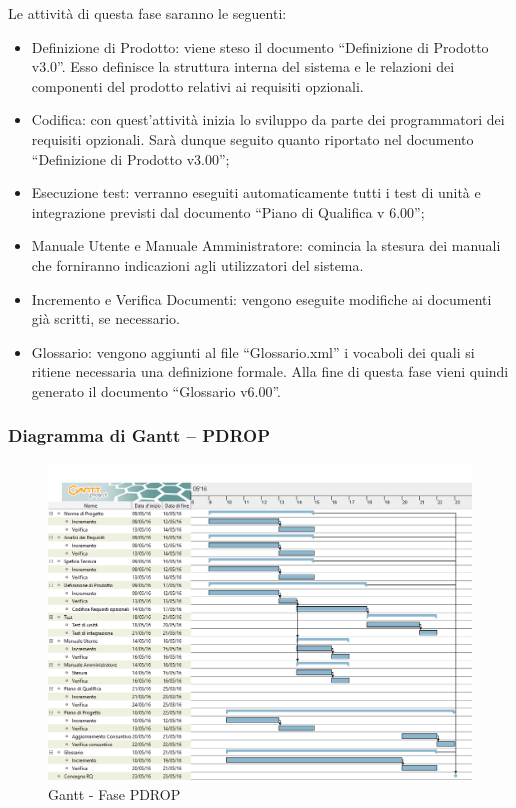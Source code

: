 \documentclass[../PianoProgetto.tex]{subfiles}
\begin{document}
		Le attività di questa fase saranno le seguenti:
		\begin{itemize}
			\item Definizione di Prodotto: viene steso il documento “Definizione di Prodotto v3.0”. Esso definisce la struttura interna del sistema e le relazioni dei componenti del prodotto relativi ai requisiti opzionali.

			\item Codifica: con quest’attività inizia lo sviluppo da parte dei programmatori dei requisiti opzionali. Sarà dunque seguito quanto riportato nel documento “Definizione di Prodotto v3.00”;

			\item Esecuzione test: verranno eseguiti automaticamente tutti i test di unità e integrazione previsti dal documento “Piano di Qualifica v 6.00”;

			\item Manuale Utente e Manuale Amministratore: comincia la stesura dei manuali che forniranno indicazioni agli utilizzatori del sistema.

			\item Incremento e Verifica Documenti: vengono eseguite modifiche ai documenti già scritti, se necessario.
			
			\item Glossario: vengono aggiunti al file “Glossario.xml” i vocaboli dei quali si ritiene necessaria una definizione formale. Alla fine di questa fase vieni quindi generato il documento “Glossario v6.00”.
		\end{itemize}
		
		\subsubsection{Diagramma di Gantt – PDROP}
			\begin{figure}[!h]
				\centering
				\includegraphics[width=\textwidth]{gantt_png/6-requisiti_facoltativi}
				\caption{Gantt - Fase PDROP}
				\label{fig:Gantt - Fase PDROP}
			\end{figure}
			
\end{document}
